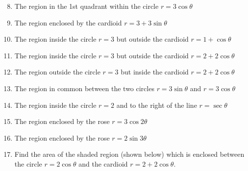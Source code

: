 \documentclass[12pt]{article}
\newif\ifans
\begin{document}
\begin{enumerate}
\setcounter{enumi}{7}

\item The region in the 1st quadrant within the circle $r=3\cos{\theta}$ 

\ifans{\fbox{$\frac{9\pi}{8}$}} \fi

\item The region enclosed by the cardioid $r=3+3\sin{\theta}$ 

\ifans{\fbox{$\frac{27\pi}{2}$}} \fi

\item The region inside the circle $r=3$ but outside the cardioid $r=1+\cos{\theta}$ 

\ifans{\fbox{$\frac{15\pi}{2}$}} \fi

\item The region inside the circle $r=3$ but outside the cardioid $r=2+2\cos{\theta}$ 

\ifans{\fbox{$\frac{9\sqrt{3}}{2}+2\pi$}} \fi

\item The region outside the circle $r=3$ but inside the cardioid $r=2+2\cos{\theta}$ 

\ifans{\fbox{$\frac{9\sqrt{3}}{2}-\pi$}} \fi

\item The region in common between the two circles $r=3\sin{\theta}$ and $r=3\cos{\theta}$ 

\ifans{\fbox{$-\frac{9}{4}+\frac{9\pi}{8}$}} \fi

\item The region inside the circle $r=2$ and to the right of the line $r=\sec{\theta}$ 

\ifans{\fbox{$\frac{4\pi}{3}-\sqrt{3}$}} \fi

\item The region enclosed by the rose $r=3\cos{2\theta}$ 

\ifans{\fbox{$\frac{9\pi}{2}$}} \fi

\item The region enclosed by the rose $r=2\sin{3\theta}$ 

\ifans{\fbox{$\pi$}} \fi

\item Find the area of the shaded region (shown below) which is enclosed between the circle $r=2\cos{\theta}$ and the cardioid $r=2+2\cos{\theta}$.


\end{enumerate}
\end{document}
